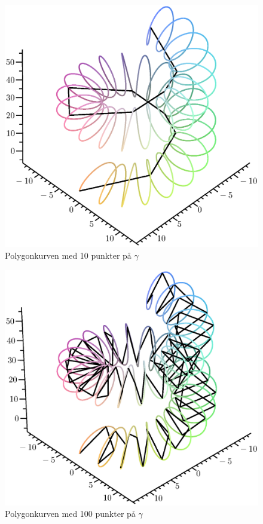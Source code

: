 \begin{figure}[hb]
\center
\includegraphics[scale=0.6]{pictures/slinky10.eps}
\caption{Polygonkurven med 10 punkter på \(\gamma\)}
\label{slinky10}
\end{figure}
\begin{figure}[ht]
\center
\includegraphics[scale=0.4]{pictures/slinky100.eps}
\caption{Polygonkurven med 100 punkter på \(\gamma\)}
\label{slinky100}
\end{figure}

